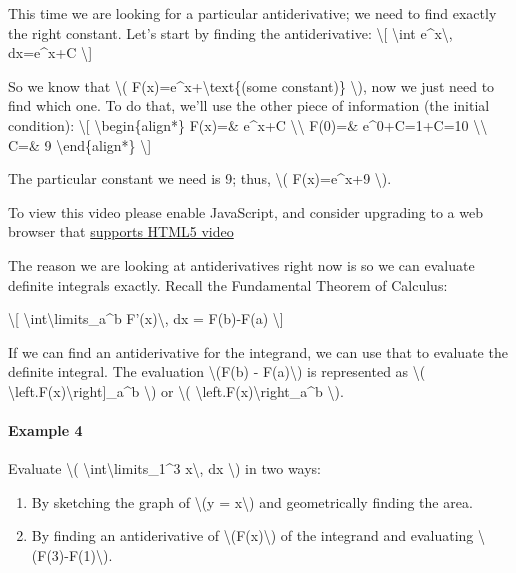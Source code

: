 This time we are looking for a particular antiderivative; we need to
find exactly the right constant. Let's start by finding the
antiderivative: \textbackslash{}{[} \textbackslash{}int
e\^{}x\textbackslash{}, dx=e\^{}x+C \textbackslash{}{]}

So we know that \textbackslash{}(
F(x)=e\^{}x+\textbackslash{}text\{(some constant)\} \textbackslash{}),
now we just need to find which one. To do that, we'll use the other
piece of information (the initial condition): \textbackslash{}{[}
\textbackslash{}begin\{align*\} F(x)=\& e\^{}x+C
\textbackslash{}\textbackslash{} F(0)=\& e\^{}0+C=1+C=10
\textbackslash{}\textbackslash{} C=\& 9 \textbackslash{}end\{align*\}
\textbackslash{}{]}

The particular constant we need is 9; thus, \textbackslash{}(
F(x)=e\^{}x+9 \textbackslash{}).

To view this video please enable JavaScript, and consider upgrading to a
web browser that \href{http://videojs.com/html5-video-support/}{supports
HTML5 video}

The reason we are looking at antiderivatives right now is so we can
evaluate definite integrals exactly. Recall the Fundamental Theorem of
Calculus:

\textbackslash{}{[} \textbackslash{}int\textbackslash{}limits\_a\^{}b
F'(x)\textbackslash{}, dx = F(b)-F(a) \textbackslash{}{]}

If we can find an antiderivative for the integrand, we can use that to
evaluate the definite integral. The evaluation \textbackslash{}(F(b) -
F(a)\textbackslash{}) is represented as \textbackslash{}(
\textbackslash{}left.F(x)\textbackslash{}right{]}\_a\^{}b
\textbackslash{}) or \textbackslash{}(
\textbackslash{}left.F(x)\textbackslash{}right\textbar{}\_a\^{}b
\textbackslash{}).

\hypertarget{example-4}{%
\paragraph{Example 4}\label{example-4}}

Evaluate \textbackslash{}(
\textbackslash{}int\textbackslash{}limits\_1\^{}3 x\textbackslash{}, dx
\textbackslash{}) in two ways:

\begin{enumerate}
\tightlist
\item
  By sketching the graph of \textbackslash{}(y = x\textbackslash{}) and
  geometrically finding the area.
\item
  By finding an antiderivative of \textbackslash{}(F(x)\textbackslash{})
  of the integrand and evaluating
  \textbackslash{}(F(3)-F(1)\textbackslash{}).
\end{enumerate}

